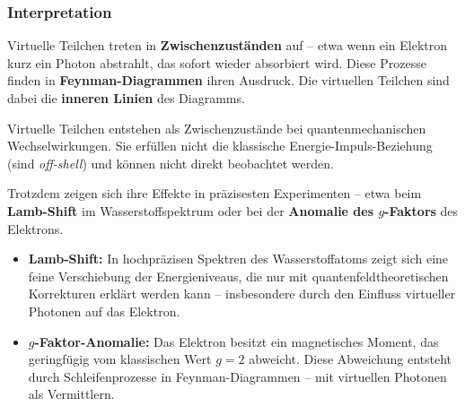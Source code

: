 \subsubsection*{Interpretation}

Virtuelle Teilchen treten in \textbf{Zwischenzuständen} auf – etwa wenn ein Elektron kurz ein Photon abstrahlt, das sofort wieder absorbiert wird.
Diese Prozesse finden in \textbf{Feynman-Diagrammen} ihren Ausdruck. Die virtuellen Teilchen sind dabei die \textbf{inneren Linien} des Diagramms.

\vspace{1em}


\vspace{1em}
\begin{tcolorbox}[physikbox, title=Virtuelle Teilchen im Quantenvakuum, label=box:virtuelle-teilchen]
	\label{box:virtuelle-teilchen}
	Virtuelle Teilchen entstehen als Zwischenzustände bei quantenmechanischen Wechselwirkungen. Sie erfüllen nicht die klassische Energie-Impuls-Beziehung (sind \emph{off-shell}) und können nicht direkt beobachtet werden.
	
	Trotzdem zeigen sich ihre Effekte in präzisesten Experimenten – etwa beim \textbf{Lamb-Shift} im Wasserstoffspektrum oder bei der \textbf{Anomalie des $g$-Faktors} des Elektrons.
\end{tcolorbox}

\vspace{1em}
\begin{tcolorbox}[hinweisbox, title=Indirekte Nachweise virtueller Photonen]
	\label{box:Nachweis virtueller Photonen}
	\small
	\begin{itemize}
		\item \textbf{Lamb-Shift:} In hochpräzisen Spektren des Wasserstoffatoms zeigt sich eine feine Verschiebung der Energieniveaus, die nur mit quantenfeldtheoretischen Korrekturen erklärt werden kann – insbesondere durch den Einfluss virtueller Photonen auf das Elektron.
		\item \textbf{$g$-Faktor-Anomalie:} Das Elektron besitzt ein magnetisches Moment, das geringfügig vom klassischen Wert $g = 2$ abweicht. Diese Abweichung entsteht durch Schleifenprozesse in Feynman-Diagrammen – mit virtuellen Photonen als Vermittlern.
	\end{itemize}
\end{tcolorbox}

